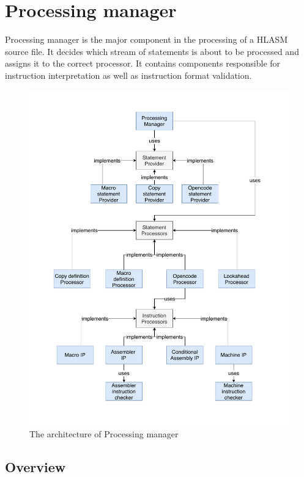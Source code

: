 \section{Processing manager}

Processing manager is the major component in the processing of a HLASM source file. It decides which stream of statements is about to be processed and assigns it to the correct processor. It contains components responsible for instruction interpretation as well as instruction format validation. 

\begin{figure}
	\centering
	\includegraphics[width=\textwidth]{img/processing_manager_arch}
	\caption{The architecture of Processing manager}
	\label{fig06:proc_mngr}
\end{figure}

\subsection{Overview}


